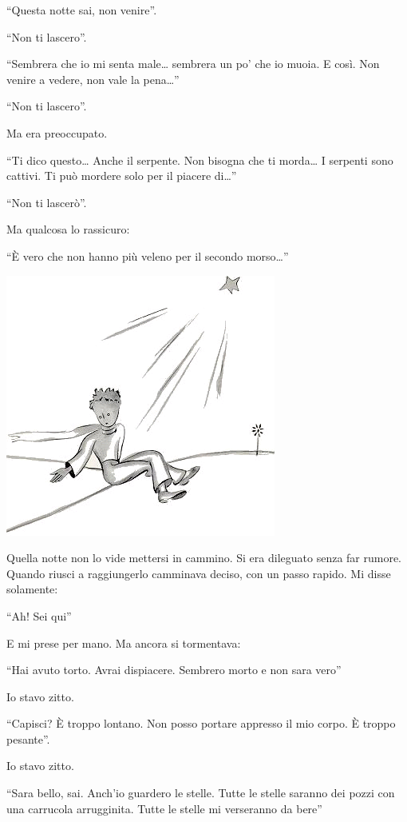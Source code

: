 \documentclass[11pt]{scrbook}
\begin{document}
``Questa notte sai, non venire''.

``Non ti lascero''.

``Sembrera che io mi senta male\ldots{} sembrera un po' che io muoia. E
così. Non venire a vedere, non vale la pena\ldots{}''

``Non ti lascero''.

Ma era preoccupato.

``Ti dico questo\ldots{} Anche il serpente. Non bisogna che ti
morda\ldots{} I serpenti sono cattivi. Ti può mordere solo per il
piacere di\ldots{}''

``Non ti lascerò''.

Ma qualcosa lo rassicuro:

``È vero che non hanno più veleno per il secondo morso\ldots{}''

\begin{center}
\includegraphics{./img/26b.png}
\end{center}

Quella notte non lo vide mettersi in cammino. Si era dileguato senza far
rumore. Quando riusci a raggiungerlo camminava deciso, con un passo
rapido. Mi disse solamente:

``Ah! Sei qui''

E mi prese per mano. Ma ancora si tormentava:

``Hai avuto torto. Avrai dispiacere. Sembrero morto e non sara vero''

Io stavo zitto.

``Capisci? È troppo lontano. Non posso portare appresso il mio corpo. È
troppo pesante''.

Io stavo zitto.

``Sara bello, sai. Anch'io guardero le stelle. Tutte le stelle saranno
dei pozzi con una carrucola arrugginita. Tutte le stelle mi verseranno
da bere''
\end{document}
